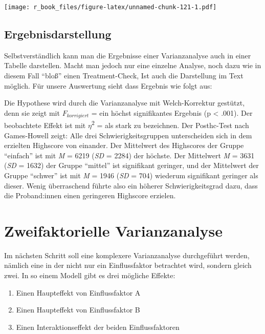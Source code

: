 \documentclass[
]{book}
\providecommand{\tightlist}{%
  \setlength{\itemsep}{0pt}\setlength{\parskip}{0pt}}
\begin{document}
\texttt{[image: r\_book\_files/figure-latex/unnamed-chunk-121-1.pdf]}

\hypertarget{ergebnisdarstellung}{%
\subsection{Ergebnisdarstellung}\label{ergebnisdarstellung}}

Selbstverständlich kann man die Ergebnisse einer Varianzanalyse auch in einer Tabelle darstellen. Macht man jedoch nur eine einzelne Analyse, noch dazu wie in diesem Fall ``bloß'' einen Treatment-Check, Ist auch die Darstellung im Text möglich. Für unsere Auswertung sieht dass Ergebnis wie folgt aus:

Die Hypothese wird durch die Varianzanalyse mit Welch-Korrektur gestützt, denn sie zeigt mit \(F_{korrigiert}\) =  ein höchst signifikantes Ergebnis (p \textless{} .001). Der beobachtete Effekt ist mit \(\eta\)\textsuperscript{2} =  als stark zu bezeichnen. Der Posthc-Test nach Games-Howell zeigt: Alle drei Schwierigkeitsgruppen unterscheiden sich in dem erzielten Highscore von einander. Der Mittelwert des Highscores der Gruppe ``einfach'' ist mit \emph{M} = 6219 (\emph{SD} = 2284) der höchste. Der Mittelwert \emph{M} = 3631 (\emph{SD} = 1632) der Gruppe ``mittel'' ist signifikant geringer, und der Mittelwert der Gruppe ``schwer'' ist mit \emph{M} = 1946 (\emph{SD} = 704) wiederum signifikant geringer als dieser. Wenig überraschend führte also ein höherer Schwierigkeitsgrad dazu, dass die Proband:innen einen geringeren Highscore erzielen.

\hypertarget{zweifaktorielle-varianzanalyse}{%
\section{Zweifaktorielle Varianzanalyse}\label{zweifaktorielle-varianzanalyse}}

Im nächsten Schritt soll eine komplexere Varianzanalyse durchgeführt werden, nämlich eine in der nicht nur ein Einflussfaktor betrachtet wird, sondern gleich zwei. In so einem Modell gibt es drei mögliche Effekte:

\begin{enumerate}
\def\labelenumi{\arabic{enumi}.}
\tightlist
\item
  Einen Haupteffekt von Einflussfaktor A
\item
  Einen Haupteffekt von Einflussfaktor B
\item
  Einen Interaktionseffekt der beiden Einflussfaktoren
\end{enumerate}
\end{document}
